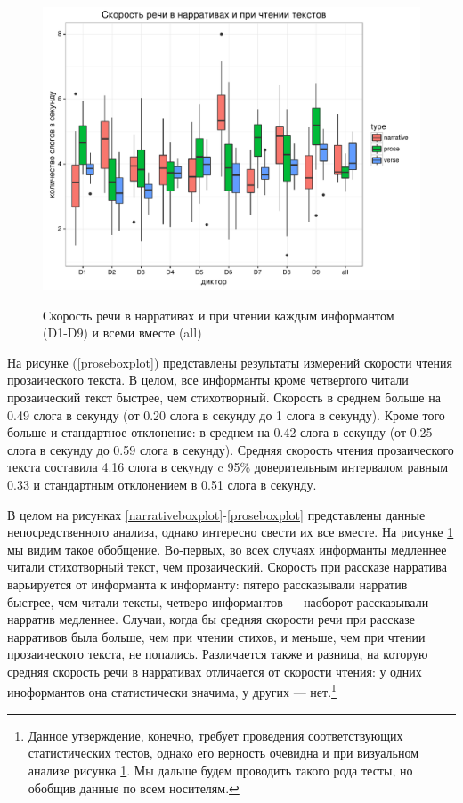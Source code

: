 \begin{figure}[b!]
\caption{Скорость речи в нарративах и при чтении каждым информантом (D1-D9) и всеми вместе (all)}
        \includegraphics[width=\linewidth]{alltypesboxplot.pdf}
        \label{alltypesboxplot}
\end{figure}
\par На рисунке (\ref{proseboxplot}) представлены результаты измерений скорости чтения прозаического текста. В целом, все информанты кроме четвертого читали прозаический текст быстрее, чем стихотворный. Скорость в среднем больше на 0.49 слога в секунду (от 0.20 слога в секунду до 1 слога в секунду). Кроме того больше и стандартное отклонение: в среднем на 0.42 слога в секунду (от 0.25 слога в секунду до 0.59 слога в секунду). Средняя скорость чтения прозаического текста составила 4.16 слога в секунду c 95\% доверительным интервалом равным 0.33 и стандартным отклонением в 0.51 слога в секунду.
\par В целом на рисунках \ref{narrativeboxplot}-\ref{proseboxplot} представлены данные непосредственного анализа, однако интересно свести их все вместе. На рисунке \ref{alltypesboxplot} мы видим такое обобщение. Во-первых, во всех случаях информанты медленнее читали стихотворный текст, чем прозаический. Скорость при рассказе нарратива варьируется от информанта к информанту: пятеро рассказывали нарратив быстрее, чем читали тексты, четверо информантов --- наоборот рассказывали нарратив медленнее.  Случаи, когда бы средняя скорости речи при рассказе нарративов была больше, чем при чтении стихов, и меньше, чем при чтении прозаического текста, не попались. Различается также и разница, на которую средняя скорость речи в нарративах отличается от скорости чтения: у одних иноформантов она статистически значима, у других --- нет.\footnote{Данное утверждение, конечно, требует проведения соответствующих статистических тестов, однако его верность очевидна и при визуальном анализе рисунка \ref{alltypesboxplot}. Мы дальше будем проводить такого рода тесты, но обобщив данные по всем носителям.}
